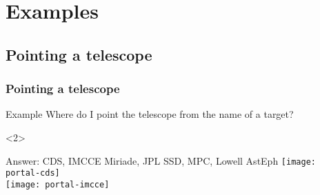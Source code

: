 \section{Examples}

\subsection{Pointing a telescope}
\begin{frame}
  \frametitle{Pointing a telescope}

  \begin{overlayarea}{\textwidth}{0.15\textheight}
    \vspace{-0.5em}
    \begin{exampleblock}{Example}
      Where do I point the telescope from the name of a target?
    \end{exampleblock}
  \end{overlayarea}

  \begin{overlayarea}{\textwidth}{0.8\textheight}
    \begin{onlyenv}<2>
      \begin{block}{Answer: CDS, IMCCE Miriade, JPL SSD, MPC, Lowell AstEph}
        \hspace{.10\hsize}\texttt{[image: portal-cds]}\\
        \hspace{.35\hsize}\texttt{[image: portal-imcce]}
      \end{block}
    \end{onlyenv}
  \end{overlayarea}

\end{frame}



